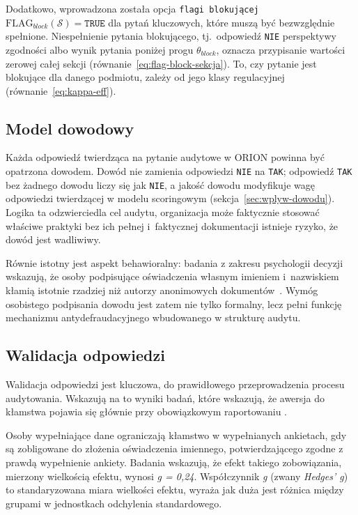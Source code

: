 Dodatkowo, wprowadzona została opcja \texttt{flagi blokującej} $\text{FLAG}_{block}(\mathcal{S}) = \texttt{TRUE}$
 dla pytań kluczowych, które muszą być bezwzględnie spełnione. Niespełnienie pytania blokującego, tj.\ odpowiedź \texttt{NIE} perspektywy zgodności albo wynik pytania poniżej progu $\theta_{block}$, oznacza przypisanie wartości zerowej całej sekcji (równanie~\eqref{eq:flag-block-sekcja}). To, czy pytanie jest blokujące dla danego podmiotu, zależy od jego klasy regulacyjnej (równanie~\eqref{eq:kappa-eff}).


\subsection{Model dowodowy}
\label{sec:dowody}


Każda odpowiedź twierdząca na pytanie audytowe w ORION powinna być opatrzona dowodem. Dowód nie zamienia odpowiedzi \texttt{NIE} na \texttt{TAK}; odpowiedź \texttt{TAK} bez żadnego dowodu liczy się jak \texttt{NIE}, a jakość dowodu modyfikuje wagę odpowiedzi twierdzącej w modelu scoringowym (sekcja~\ref{sec:wplyw-dowodu}).
Logika ta odzwierciedla cel audytu,  organizacja może faktycznie stosować właściwe praktyki bez ich pełnej i~faktycznej dokumentacji istnieje ryzyko, że dowód jest wadliwiwy.

Równie istotny jest aspekt behawioralny: badania z zakresu psychologii decyzji wskazują, że osoby podpisujące oświadczenia własnym imieniem i~nazwiskiem
kłamią istotnie rzadziej niż autorzy anonimowych dokumentów~\autocite{friesen2013designing}. Wymóg osobistego
podpisania dowodu jest zatem nie tylko formalny, lecz pełni funkcję mechanizmu antydefraudacyjnego wbudowanego w strukturę audytu.


\subsection{Walidacja odpowiedzi}

Walidacja odpowiedzi jest kluczowa, do prawidłowego przeprowadzenia procesu audytowania. Wskazują na to wyniki badań, które wskazują, że awersja do kłamstwa pojawia się głównie przy obowiązkowym raportowaniu \autocite{friesen2013designing}.

Osoby wypełniające dane ograniczają kłamstwo w wypełnianych ankietach, gdy są zobligowane do złożenia oświadczenia imiennego, potwierdzającego zgodne z prawdą wypełnienie ankiety. Badania wskazują, że efekt takiego zobowiązania, mierzony wielkością efektu, wynosi \textit{g = 0,24}\autocite{peer2023commitment}. Współczynnik \textit{g} (zwany \textit{Hedges' g}) to standaryzowana miara wielkości efektu,  wyraża jak duża jest różnica między grupami w jednostkach odchylenia standardowego.


